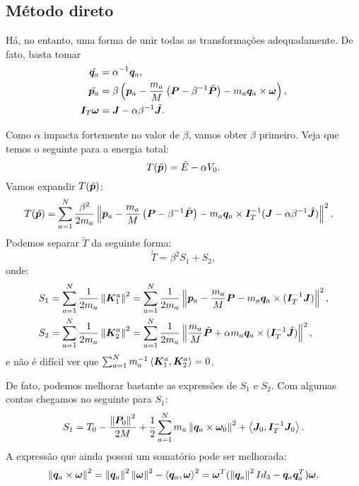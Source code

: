 \subsection{Método direto}
Há, no entanto, uma forma de unir todas as transformações adequadamente. De fato, basta tomar
\begin{align}
    \tilde{\bm q_a} &= \alpha^{-1} \bm q_a, \\
    \tilde{\bm p_a} &= \beta\left(\bm p_a - \dfrac{m_a}{M} \left(\bm P - \beta^{-1} \tilde{\bm P}\right) - m_a \bm q_a \times \bm \omega\right), \\
    \bm I_T \bm \omega &= \bm J - \alpha \beta^{-1} \tilde{\bm J}.
\end{align}

Como $\alpha$ impacta fortemente no valor de $\beta$, vamos obter $\beta$ primeiro. Veja que temos o seguinte para a energia total:
\begin{equation}\label{eq:t_til_e_til_v0}
    T(\tilde{\bm p}) = \tilde E - \alpha V_0.
\end{equation}
Vamos expandir $T(\tilde{\bm p})$:
\begin{align*}
    T(\tilde{\bm p}) 
    &= \sum_{a=1}^{N} \dfrac{\beta^2}{2m_a} \left\Vert \bm p_a - \dfrac{m_a}{M}\left(\bm P - \beta^{-1} \tilde{\bm P}\right) - m_a \bm q_a \times \bm I_{T}^{-1} (\bm J - \alpha \beta^{-1} \tilde{\bm J}) \right\Vert^2.
\end{align*}
Podemos separar $\tilde T$ da seguinte forma:
\begin{equation}\label{eq:separacao_t_til}
    \tilde T = \beta^2 S_1 + S_2,
\end{equation}
onde:
\begin{align*}
    S_1 &= \sum_{a=1}^N \dfrac{1}{2m_a} \left\Vert \bm K_1^a \right\Vert^2
    = \sum_{a=1}^N \dfrac{1}{2m_a} \left\Vert \bm p_a - \dfrac{m_a}{M} \bm P - m_a \bm q_a \times (\bm I_T^{-1} \bm J) \right\Vert^2, \\
    S_2 &= \sum_{a=1}^N \dfrac{1}{2m_a} \left\Vert \bm K_2^a \right\Vert^2 = \sum_{a=1}^N \dfrac{1}{2 m_a} \left\Vert \dfrac{m_a}{M} \tilde{\bm P} + \alpha m_a \bm q_a \times (\bm I_T^{-1} \tilde{\bm J}) \right\Vert^2,
\end{align*}
e não é difícil ver que $\sum_{a=1}^N m_a^{-1} \left\langle \bm K_1^a, \bm K_2^a \right\rangle = 0$.

De fato, podemos melhorar bastante as expressões de $S_1$ e $S_2$. Com algumas contas chegamos no seguinte para $S_1$:
\begin{equation}
    S_1 = T_0 - \dfrac{\left\Vert \bm P_0 \right\Vert^2}{2 M} + \dfrac{1}{2} \sum_{a=1}^N m_a \left\Vert \bm q_a \times \bm \omega_0 \right\Vert^2 + \left\langle \bm J_0, \bm I_T^{-1} \bm J_0 \right\rangle.
\end{equation}
A expressão que ainda possui um somatório pode ser melhorada:
$$
\left\Vert \bm q_a \times \bm \omega \right\Vert^2 = \left\Vert \bm q_a \right\Vert^2 \left\Vert \bm \omega \right\Vert^2 - \left\langle \bm q_a, \bm \omega \right\rangle^2
=
\bm \omega^T (\left\Vert \bm q_a \right\Vert^2 Id_3 - \bm q_a \bm q_a^T) \bm \omega.
$$

